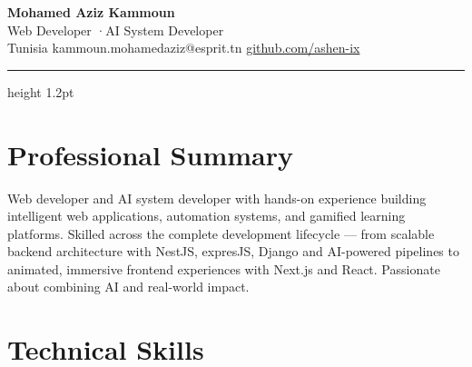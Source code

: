 \documentclass[10pt, a4paper]{article}
\begin{document}
\begin{center}
  {\LARGE\bfseries\color{navy} Mohamed Aziz Kammoun}\\[4pt]
  {\normalsize\color{muted}
    Web Developer \enspace·\enspace AI System Developer}\\[5pt]
  {\small
    \textcolor{muted}{\faMapMarker*\enspace Tunisia}
    \quad
    \textcolor{muted}{\faEnvelope\enspace kammoun.mohamedaziz@esprit.tn}
    \quad
    \href{https://github.com/ashen-ix}{\faGithub\enspace github.com/ashen-ix}
  }
\end{center}

\vspace{2pt}
{\color{accent}\hrule height 1.2pt}
\vspace{8pt}

\section{Professional Summary}

Web developer and AI system developer with hands-on experience building intelligent web
applications, automation systems, and gamified learning platforms. Skilled across the complete
development lifecycle — from scalable backend architecture with NestJS, expresJS, Django and AI-powered pipelines
to animated, immersive frontend experiences with Next.js and React. Passionate about combining
AI and real-world impact.

\vspace{2pt}

\section{Technical Skills}
\end{document}

